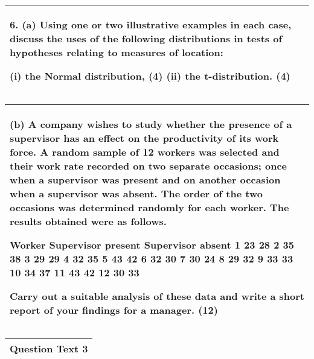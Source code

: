 \documentclass[a4paper,12pt]{article}
\begin{document}
  \begin{table}[ht!]
  \centering
  \begin{tabular}{|p{15cm}|}
  \hline  
6. (a) Using one or two illustrative examples in each case, discuss the uses of the following distributions in tests of hypotheses relating to measures of location: 
 
  (i) the Normal distribution, 
(4) 
  (ii) the t-distribution. 
(4) 
 
 \\ \hline
   \end{tabular}
 \end{table}
 
  \begin{table}[ht!]
  \centering
  \begin{tabular}{|p{15cm}|}
  \hline  
 (b) A company wishes to study whether the presence of a supervisor has an effect on the productivity of its work force.  A random sample of 12 workers was selected and their work rate recorded on two separate occasions; once when a supervisor was present and on another occasion when a supervisor was absent.  The order of the two occasions was determined randomly for each worker.  The results obtained were as follows. 
 
Worker Supervisor present 
Supervisor absent 1 23 28 2 35 38 3 29 29 4 32 35 5 43 42 6 32 30 7 30 24 8 29 32 9 33 33 10 34 37 11 43 42 12 30 33 
 
 
Carry out a suitable analysis of these data and write a short report of your findings for a manager. (12) \\ \hline 
   \end{tabular}
 \end{table}
  \begin{table}[ht!]
  \centering
  \begin{tabular}{|p{15cm}|}
  \hline  
Question Text 3 
\\ \hline
   \end{tabular}
 \end{table}
  
\end{document}
